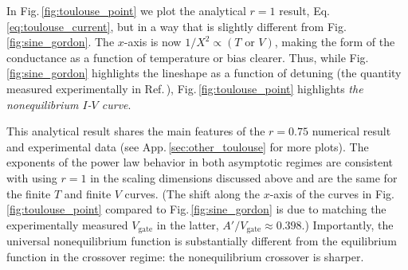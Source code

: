 \documentclass[aps,prb,reprint,floatfix,superscriptaddress,amssymb,amsmath]{revtex4-2}
\newcommand{\Vg}{V_\text{gate}}
\begin{document}
In Fig.\,\ref{fig:toulouse_point} we plot the analytical $r\!=\!1$ result, Eq.\,\eqref{eq:toulouse_current}, but in a way that is slightly different from Fig.\,\ref{fig:sine_gordon}. The $x$-axis is now $1/X^2 \!\propto\! (T\text{ or }V)$, making the form of the conductance as a function of temperature or bias clearer. Thus, while Fig.\,\ref{fig:sine_gordon} highlights the lineshape as a function of detuning (the quantity measured experimentally in Ref.\,\cite{Mebrahtu13}), Fig.\,\ref{fig:toulouse_point} highlights \textit{the nonequilibrium $I$-$V$ curve}. 

This analytical result shares the main features of the $r \!=\! 0.75$ numerical result and experimental data (see App.\,\ref{sec:other_toulouse} for more plots). The exponents of the power law behavior in both asymptotic regimes are consistent with using $r\!=\!1$ in the scaling dimensions discussed above and are the same for the finite $T$ and finite $V$ curves. 
(The shift along the $x$-axis of the curves in Fig.\,\ref{fig:toulouse_point} compared to Fig.\,\ref{fig:sine_gordon} is due to matching the experimentally measured $\Vg$ in the latter, $A'/\Vg\!\approx\! 0.398$.)
Importantly, the universal nonequilibrium function is substantially different from the equilibrium function in the crossover regime: the nonequilibrium crossover is sharper.  

\end{document}
